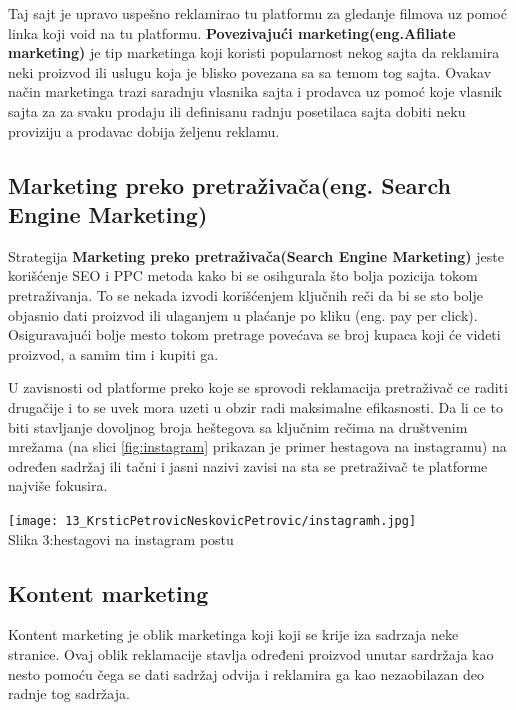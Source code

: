 \documentclass[a4paper]{article}
\begin{document}
{Taj sajt je upravo uspešno reklamirao tu platformu za gledanje filmova uz pomoć linka koji void na tu platformu. \textbf{Povezivajući marketing(eng.Afiliate marketing)} je tip marketinga koji koristi popularnost nekog sajta da reklamira neki proizvod ili uslugu koja je blisko povezana sa sa temom tog sajta. 
Ovakav način marketinga trazi saradnju vlasnika sajta i prodavca uz pomoć koje vlasnik sajta za za svaku prodaju ili definisanu radnju posetilaca sajta dobiti neku proviziju a prodavac dobija željenu reklamu.







\subsection{Marketing preko pretraživača(eng. Search Engine Marketing) }
\label{subsec:SAM}
Strategija \textbf{Marketing preko pretraživača(Search Engine Marketing)} jeste korišćenje SEO i PPC metoda kako bi se osihgurala što bolja pozicija tokom pretraživanja. To se nekada izvodi korišćenjem ključnih reči da bi se sto bolje objasnio dati proizvod ili ulaganjem u plaćanje po kliku (eng. pay per click). Osiguravajući bolje mesto tokom pretrage povećava se broj kupaca koji će videti proizvod, a samim tim i kupiti ga.

 U zavisnosti od platforme preko koje se sprovodi reklamacija pretraživač ce raditi drugačije i to se uvek mora uzeti u obzir radi maksimalne efikasnosti. Da li ce to biti stavljanje dovoljnog broja heštegova sa ključnim rečima na društvenim mrežama (na slici \ref{fig:instagram} prikazan je primer hestagova na instagramu) na određen sadržaj ili tačni i jasni nazivi zavisi na sta se pretraživač te platforme najviše fokusira.


\begin{center}
    \texttt{[image: 13\_KrsticPetrovicNeskovicPetrovic/instagramh.jpg]}\\
    \large{Slika 3:hestagovi na instagram postu}
\end{center}
\label{fig:instagram}

\subsection{Kontent marketing  }
\label{subsec:Kontent marketing}
Kontent marketing je oblik marketinga koji koji se krije iza sadrzaja neke stranice. Ovaj oblik reklamacije stavlja određeni proizvod unutar sardržaja kao nesto pomoću čega se dati sadržaj odvija i reklamira ga kao nezaobilazan deo radnje tog sadržaja. 

}
\end{document}
